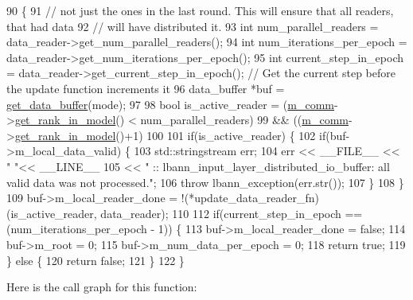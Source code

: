 \begin{DoxyCode}
90                                                                                                            
       \{
91   \textcolor{comment}{// not just the ones in the last round.  This will ensure that all readers, that had data}
92   \textcolor{comment}{// will have distributed it.}
93   \textcolor{keywordtype}{int} num\_parallel\_readers = data\_reader->get\_num\_parallel\_readers();
94   \textcolor{keywordtype}{int} num\_iterations\_per\_epoch = data\_reader->get\_num\_iterations\_per\_epoch();
95   \textcolor{keywordtype}{int} current\_step\_in\_epoch = data\_reader->get\_current\_step\_in\_epoch(); \textcolor{comment}{// Get the current step before the
       update function increments it}
96   data\_buffer *buf = \hyperlink{classlbann_1_1distributed__io__buffer_ac176f3fced1191534a985f831136aa3e}{get\_data\_buffer}(mode);
97 
98   \textcolor{keywordtype}{bool} is\_active\_reader = (\hyperlink{classlbann_1_1generic__io__buffer_a2e4a46c85c8b30e10b1cc5acaa2c4cca}{m\_comm}->\hyperlink{classlbann_1_1lbann__comm_a789453454468a3b70de768537c50ca52}{get\_rank\_in\_model}() < num\_parallel\_readers)
99     && ((\hyperlink{classlbann_1_1generic__io__buffer_a2e4a46c85c8b30e10b1cc5acaa2c4cca}{m\_comm}->\hyperlink{classlbann_1_1lbann__comm_a789453454468a3b70de768537c50ca52}{get\_rank\_in\_model}()+1)%
100 
101   \textcolor{keywordflow}{if}(is\_active\_reader) \{
102       \textcolor{keywordflow}{if}(buf->m\_local\_data\_valid) \{ 
103         std::stringstream err;
104         err << \_\_FILE\_\_ << \textcolor{stringliteral}{" "}<<  \_\_LINE\_\_
105             << \textcolor{stringliteral}{" :: lbann\_input\_layer\_distributed\_io\_buffer: all valid data was not processed."};
106         \textcolor{keywordflow}{throw} lbann\_exception(err.str());
107       \}
108   \}
109   buf->m\_local\_reader\_done = !(*update\_data\_reader\_fn)(is\_active\_reader, data\_reader);
110 
112   \textcolor{keywordflow}{if}(current\_step\_in\_epoch == (num\_iterations\_per\_epoch - 1)) \{
113     buf->m\_local\_reader\_done = \textcolor{keyword}{false};
114     buf->m\_root = 0; 
115     buf->m\_num\_data\_per\_epoch = 0;
118     \textcolor{keywordflow}{return} \textcolor{keyword}{true};
119   \} \textcolor{keywordflow}{else} \{
120     \textcolor{keywordflow}{return} \textcolor{keyword}{false};
121   \}
122 \}
\end{DoxyCode}
Here is the call graph for this function\+:\nopagebreak
